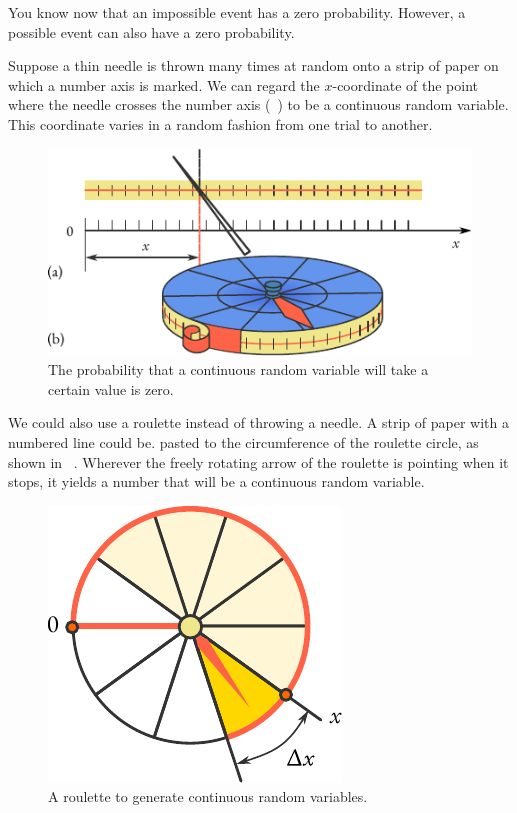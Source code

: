 You know
now that an impossible event has a zero probability. However, a
possible event can also have a zero probability.

Suppose a thin needle is thrown many times at random onto a strip
of paper on which a number axis is marked. We can regard the
$x$-coordinate of the point where the needle crosses the number axis
(~) to be a continuous random variable. This coordinate varies in a random fashion from one trial to another.

\begin{figure}[!h]
 \centering
 \includegraphics[width=0.8\tfwidth]{figures/needle.pdf}
\caption{The probability that a continuous random variable will take a
  certain value is zero.\label{needle}}
 \end{figure}
We could also use a roulette instead of throwing a needle. A strip of
paper with a numbered line could be. pasted to the circumference of
the roulette circle, as shown in ~. Wherever the freely
rotating arrow of the roulette is pointing when it stops, it yields a
number that will be a continuous random variable.

\begin{figure}
 \centering
 \includegraphics[width=0.9\linewidth]{figures/roulette.pdf}
\caption{A roulette to generate continuous random variables.\label{roulette}}
 \end{figure}

